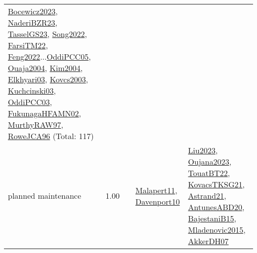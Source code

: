 {\begin{longtable}{p{3cm}r>{\raggedright\arraybackslash}p{6cm}>{\raggedright\arraybackslash}p{6cm}>{\raggedright\arraybackslash}p{8cm}}
\hyperref[detail:Bocewicz2023]{Bocewicz2023}, \hyperref[detail:NaderiBZR23]{NaderiBZR23}, \hyperref[detail:TasselGS23]{TasselGS23}, \hyperref[detail:Song2022]{Song2022}, \hyperref[detail:FarsiTM22]{FarsiTM22}, \hyperref[detail:Feng2022]{Feng2022}...\hyperref[detail:OddiPCC05]{OddiPCC05}, \hyperref[detail:Ouaja2004]{Ouaja2004}, \hyperref[detail:Kim2004]{Kim2004}, \hyperref[detail:Elkhyari03]{Elkhyari03}, \hyperref[detail:Kovcs2003]{Kovcs2003}, \hyperref[detail:Kuchcinski03]{Kuchcinski03}, \hyperref[detail:OddiPCC03]{OddiPCC03}, \hyperref[detail:FukunagaHFAMN02]{FukunagaHFAMN02}, \hyperref[detail:MurthyRAW97]{MurthyRAW97}, \hyperref[detail:RoweJCA96]{RoweJCA96} (Total: 117)\\
\index{planned maintenance}\index{Concepts!planned maintenance}planned maintenance &  1.00 &  & \hyperref[detail:Malapert11]{Malapert11}, \hyperref[detail:Davenport10]{Davenport10} & \hyperref[detail:Liu2023]{Liu2023}, \hyperref[detail:Oujana2023]{Oujana2023}, \hyperref[detail:TouatBT22]{TouatBT22}, \hyperref[detail:KovacsTKSG21]{KovacsTKSG21}, \hyperref[detail:Astrand21]{Astrand21}, \hyperref[detail:AntunesABD20]{AntunesABD20}, \hyperref[detail:BajestaniB15]{BajestaniB15}, \hyperref[detail:Mladenovic2015]{Mladenovic2015}, \hyperref[detail:AkkerDH07]{AkkerDH07}\\

\end{longtable}}
